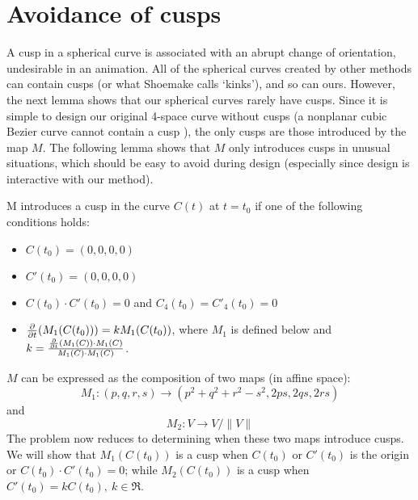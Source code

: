 \section{Avoidance of cusps}
\label{sec:cusps}


A cusp in a spherical curve is associated with an abrupt change
of orientation, undesirable in an animation.
All of the spherical curves created by other methods can contain cusps
(or what Shoemake calls `kinks'), and so can ours.
However, the next lemma shows that our spherical curves rarely have cusps.
Since it is simple to design our original 4-space curve without cusps
(a nonplanar cubic Bezier curve cannot contain a cusp \cite{farin93}),
the only cusps are those introduced by the map $M$.
The following lemma shows that $M$ only introduces cusps in unusual
situations, which should be easy to avoid during design
(especially since design is interactive with our method).

\begin{lemma}
M introduces a cusp in the curve $C(t)$ at $t=t_0$
if one of the following conditions holds:
\begin{itemize}
\item
	$C(t_0) = (0,0,0,0)$
\item
	$C'(t_0) = (0,0,0,0)$
\item
	$C(t_0) \cdot C'(t_0) = 0$ and $C_4(t_0) = C'_4(t_0) = 0$
\item
	$\frac{\partial}{\partial t}(M_1(C(t_0))) = kM_1(C(t_0))$, where $M_1$ is defined below
	and $k = \frac{\frac{\partial}{\partial t}(M_1(C)) \cdot M_1(C)}{M_1(C) \cdot M_1(C)}$.
\end{itemize}
\end{lemma}
\prf
$M$ can be expressed as the composition of two maps (in affine space):
\[
M_1: (p,q,r,s) \rightarrow (p^2 + q^2 + r^2 -s^2 , 2ps,2qs,2rs)
\]
and
\[
M_2: V \rightarrow V/\|V\|
\]
The problem now reduces to determining when these two maps introduce cusps.
We will show that $M_1(C(t_0))$ is a cusp when
$C(t_0)$ or $C'(t_0)$ is the origin or $C(t_0) \cdot C'(t_0) = 0$;
while $M_2(C(t_0))$ is a cusp when $C'(t_0) = kC(t_0),\ k \in \Re$.

